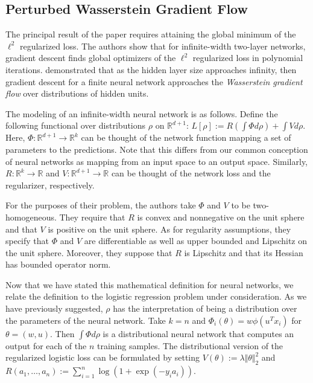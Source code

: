 \documentclass{article}
\begin{document}
\subsection{Perturbed Wasserstein Gradient Flow}
The principal result of the paper requires attaining the global minimum of the $\ell^2$ regularized loss. The authors show that for infinite-width two-layer networks, gradient descent finds global optimizers of the $\ell^2$ regularized loss in polynomial iterations. \cite{chizat2018global} demonstrated that as the hidden layer size approaches infinity, then gradient descent for a finite neural network approaches the \textit{Wasserstein gradient flow} over distributions of hidden units. 

The modeling of an infinite-width neural network is as follows. Define the following functional over distributions $\rho$ on $\mathbb{R}^{d+1}$: $L[\rho] := R(\int \Phi d\rho) + \int V d\rho$. Here, $\Phi: \mathbb{R}^{d+1} \rightarrow \mathbb{R}^k$ can be thought of the network function mapping a set of parameters to the predictions. Note that this differs from our common conception of neural networks as mapping from an input space to an output space. Similarly, $R: \mathbb{R}^k \rightarrow \mathbb{R}$ and $V: \mathbb{R}^{d+1} \rightarrow \mathbb{R}$ can be thought of the network loss and the regularizer, respectively. 

For the purposes of their problem, the authors take $\Phi$ and $V$ to be two-homogeneous. They require that $R$ is convex and nonnegative on the unit sphere and that $V$ is positive on the unit sphere. As for regularity assumptions, they specify that $\Phi$ and $V$ are differentiable as well as upper bounded and Lipschitz on the unit sphere. Moreover, they suppose that $R$ is Lipschitz and that its Hessian has bounded operator norm.

Now that we have stated this mathematical definition for neural networks, we relate the definition to the logistic regression problem under consideration. As we have previously suggested, $\rho$ has the interpretation of being a distribution over the parameters of the neural network. Take $k = n$ and $\Phi_i(\theta) = w \phi(u^T x_i)$ for $\theta = (w, u)$. Then $\int \Phi d\rho$ is a distributional neural network that computes an output for each of the $n$ training samples. The distributional version of the regularized logistic loss can be formulated by setting $V(\theta) := \lambda \Vert \theta \Vert_2^2$ and $R(a_1, \ldots, a_n) := \sum_{i=1}^n \log(1 + \exp(-y_ia_i))$.
\end{document}
